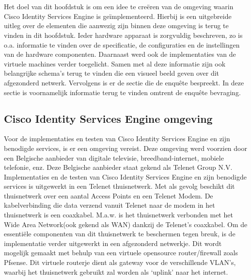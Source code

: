 
\chapter*{}
\label{ch:Proof of concept}

Het doel van dit hoofdstuk is om een idee te creëren van de omgeving waarin Cisco Identity Services Engine is geïmplementeerd. Hierbij is een uitgebreide uitleg over de elementen die aanwezig zijn binnen deze omgeving is terug te vinden in dit hoofdstuk. Ieder hardware apparaat is zorgvuldig beschreven, zo is o.a. informatie te vinden over de specificatie, de configuraties en de instellingen van de hardware componenten. Daarnaast werd ook de implementaties van de virtuele machines verder toegelicht.
\newline
\newline
Samen met al deze informatie zijn ook belangrijke schema’s terug te vinden die een visueel beeld geven over dit afgezonderd netwerk. 
Vervolgens is er de sectie die de enquête bespreekt. In deze sectie is voornamelijk informatie terug te vinden omtrent de enquête bevraging. 

\section{Cisco Identity Services Engine omgeving}

Voor de implementaties en testen van Cisco Identity Services Engine en zijn benodigde services, is er een omgeving vereist. Deze omgeving werd voorzien door een Belgische aanbieder van digitale televisie, breedband-internet, mobiele telefonie, enz. Deze Belgische aanbieder staat gekend als Telenet Group N.V. Implementaties en de testen van Cisco Identity Services Engine en zijn benodigde services is uitgewerkt in een Telenet thuisnetwerk.
\newline
Met als gevolg beschikt dit thuisnetwerk over een aantal Access Points en een Telenet Modem. De kabelverbinding die data verzend vanuit Telenet naar de modem in het thuisnetwerk is een coaxkabel. M.a.w. is het thuisnetwerk verbonden met het Wide Area Network(ook gekend als WAN) dankzij de Telenet's coaxkabel.
\newline
\newline
Om de essentiële componenten van dit thuisnetwerk te beschermen tegen breuk, is de implementatie verder uitgewerkt in een afgezonderd netwerkje. Dit wordt mogelijk gemaakt met behulp van een virtuele opensource router/firewall zoals Pfsense. Dit virtuele routerje dient als gateway voor de verschillende VLAN’s, waarbij het thuisnetwerk gebruikt zal worden als ‘uplink’ naar het internet. 

